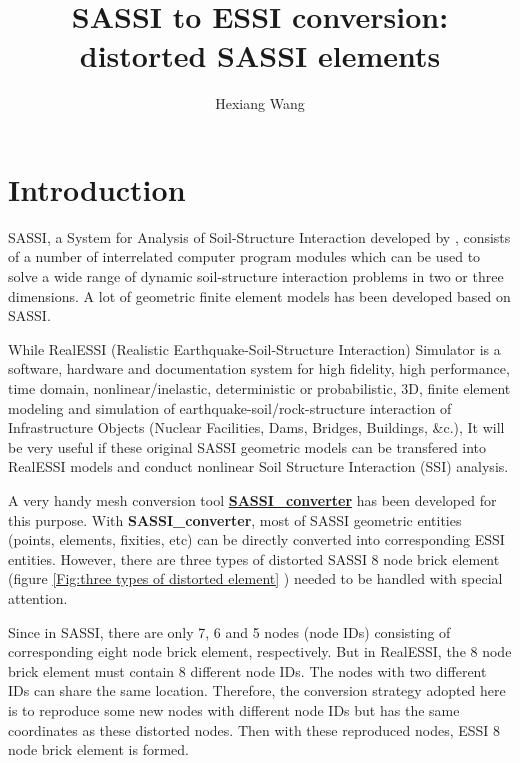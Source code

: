 \documentclass{article}
\begin{document}
\title{SASSI to ESSI conversion: distorted SASSI elements}
\author{Hexiang Wang}
\maketitle

\section{Introduction}\label{sec: introduction}

SASSI, a System for Analysis of Soil-Structure Interaction developed by \citet{SASSIUsrManual}, consists of a number of interrelated computer program modules which can be used to solve a wide range of dynamic soil-structure interaction problems in two or three dimensions.
%
A lot of geometric finite element models has been developed based on SASSI. 

%
While RealESSI (Realistic Earthquake-Soil-Structure Interaction) Simulator is a software, hardware and documentation system for high fidelity, high performance, time domain, nonlinear/inelastic, deterministic or probabilistic, 3D, finite element modeling and simulation of earthquake-soil/rock-structure interaction of Infrastructure Objects (Nuclear Facilities, Dams, Bridges, Buildings, \&c.),
%
It will be very useful if these original SASSI geometric models can be transfered into RealESSI models and conduct nonlinear Soil Structure Interaction (SSI) analysis.  

%
A very handy mesh conversion tool \href{https://github.com/hexiang6666/SASSI_converter}{\textbf{SASSI\_converter}} has been developed for this purpose.   
%
With \textbf{SASSI\_converter}, most of SASSI geometric entities (points, elements, fixities, etc) can be directly converted into corresponding ESSI entities.  
%
However, there are three types of distorted SASSI 8 node brick element (figure \ref{Fig:three types of distorted element} ) needed to be handled with special attention. 

Since in SASSI, there are only 7, 6 and 5 nodes (node IDs) consisting of corresponding eight node brick element, respectively.
%
But in RealESSI, the 8 node brick element must contain 8 different node IDs. 
%
The nodes with two different IDs can share the same location. 
%
Therefore, the conversion strategy adopted here is to reproduce some new nodes with different node IDs but has the same coordinates as these distorted nodes. 
%
Then with these reproduced nodes, ESSI 8 node brick element is formed.      
\end{document}
